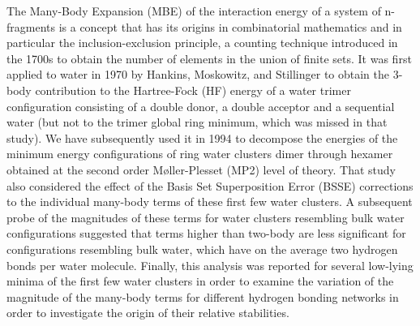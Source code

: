 \documentclass [11pt, proquest] {uwthesis}[2020/02/24]
\begin{document}
\par The Many-Body Expansion (MBE) of the interaction energy of a system of n-fragments is a concept that has its origins in combinatorial mathematics and in particular the inclusion-exclusion principle, a counting technique introduced in the 1700s to obtain the number of elements in the union of finite sets.\autocite{roberts_applied_2009} It was first applied to water in 1970 by Hankins, Moskowitz, and Stillinger\autocite{hankins_water_1970} to obtain the 3-body contribution to the Hartree-Fock (HF) energy of a water trimer configuration consisting of a double donor, a double acceptor and a sequential water (but not to the trimer global ring minimum, which was missed in that study). We have subsequently used it in 1994 to decompose the energies of the minimum energy configurations of ring water clusters dimer through hexamer obtained at the second order Møller-Plesset (MP2) level of theory.\autocite{xantheas_ab_1994} That study also considered the effect of the Basis Set Superposition Error (BSSE) corrections\autocite{boys_calculation_1970, xantheas_importance_1996} to the individual many-body terms of these first few water clusters. A subsequent probe of the magnitudes of these terms for water clusters resembling bulk water configurations suggested that terms higher than two-body are less significant for configurations resembling bulk water, which have on the average two hydrogen bonds per water molecule.\autocite{xantheas_significance_1996} Finally, this analysis was reported for several low-lying minima of the first few water clusters in order to examine the variation of the magnitude of the many-body terms for different hydrogen bonding networks in order to investigate the origin of their relative stabilities.\autocite{xantheas_cooperativity_2000}
\end{document}
